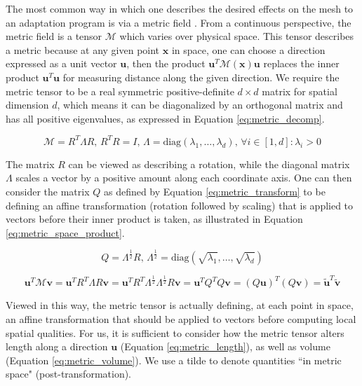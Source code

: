 The most common way in which one describes the desired effects on
the mesh to an adaptation program is via a metric field
\cite{loseille2015parallel,compere2010mesh,li20053d}.
From a continuous perspective, the metric field is a tensor
$\mathcal{M}$ which varies over physical space.
This tensor describes a metric because at any given point
$\mathbf{x}$ in space, one can choose a direction expressed
as a unit vector $\mathbf{u}$, then the product
$\mathbf{u}^T\mathcal{M}(\mathbf{x})\mathbf{u}$ replaces the inner
product $\mathbf{u}^T\mathbf{u}$ for measuring distance along
the given direction.
We require the metric tensor to be a real symmetric positive-definite
$d\times d$ matrix for spatial dimension $d$, which means it
can be diagonalized by an orthogonal matrix and has all
positive eigenvalues, as expressed in Equation \ref{eq:metric_decomp}.

\begin{equation} \label{eq:metric_decomp}
\mathcal{M} = R^T\Lambda R,\, R^T R = I,\, \Lambda = \text{diag}(\lambda_1,\dots,\lambda_d),\,
\forall i\in [1,d]: \lambda_i > 0
\end{equation}

The matrix $R$ can be viewed as describing a rotation,
while the diagonal matrix $\Lambda$ scales a vector by a positive
amount along each coordinate axis.
One can then consider the matrix $Q$ as
defined by Equation \ref{eq:metric_transform} to be defining
an affine transformation (rotation followed by scaling) that
is applied to vectors before their inner product is taken,
as illustrated in Equation \ref{eq:metric_space_product}.

\begin{equation} \label{eq:metric_transform}
Q = \Lambda^{\frac12} R,\,
\Lambda^{\frac12} = \text{diag}(\sqrt{\lambda_1},\dots,\sqrt{\lambda_d})
\end{equation}

\begin{equation} \label{eq:metric_space_product}
\mathbf{u}^T \mathcal{M}\mathbf{v} =
\mathbf{u}^T R^T\Lambda R\mathbf{v} =
\mathbf{u}^T R^T\Lambda^{\frac12} \Lambda^{\frac12}R\mathbf{v} =
\mathbf{u}^T Q^T Q\mathbf{v} =
(Q\mathbf{u})^T (Q\mathbf{v}) =
\tilde{\mathbf{u}}^T \tilde{\mathbf{v}}
\end{equation}

Viewed in this way, the metric tensor is actually defining,
at each point in space, an affine transformation that should
be applied to vectors before computing local spatial qualities.
For us, it is sufficient to consider how the metric tensor
alters length along a direction $\mathbf{u}$ (Equation \ref{eq:metric_length}),
as well as volume (Equation \ref{eq:metric_volume}).
We use a tilde to denote quantities ``in metric space" (post-transformation).

